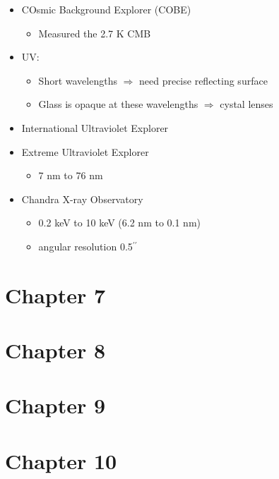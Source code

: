 \documentclass[12pt]{article}
\begin{document}
\begin{itemize}
\begin{itemize}
\item COsmic Background Explorer (COBE)
\begin{itemize}
\item Measured the 2.7 K CMB
\end{itemize}
\item UV:
\begin{itemize}
\item Short wavelengths $\Longrightarrow$ need precise reflecting surface
\item Glass is opaque at these wavelengths $\Longrightarrow$ cystal lenses
\end{itemize}
\item International Ultraviolet Explorer
\item Extreme Ultraviolet Explorer
\begin{itemize}
\item 7 nm to 76 nm
\end{itemize}
\item Chandra X-ray Observatory
\begin{itemize}
\item 0.2 keV to 10 keV (6.2 nm to 0.1 nm)
\item angular resolution 0.5$^{\prime\prime}$	
\end{itemize}
\end{itemize}
\end{itemize}


\section*{Chapter 7}

\section*{Chapter 8}

\section*{Chapter 9}

\section*{Chapter 10}
\end{document}
